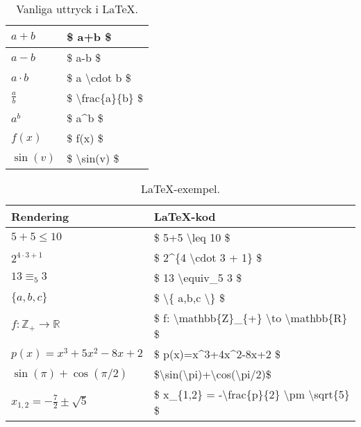\documentclass[titlepage]{article}
\begin{document}
\begin{table}
\begin{minipage}[b]{.5\linewidth}
\begin{center}
\begin{tabular}{| l | l |}
            $a+b$ & \$ a+b \$ \\
            \hline
            $a-b$ & \$ a-b \$ \\
            \hline
            $a \cdot b$ & \$ a \textbackslash cdot b \$ \\
            \hline
            $\frac{a}{b}$ & \$ \textbackslash frac\{a\}\{b\} \$ \\
            \hline
            $a^b$ & \$ a\textasciicircum b \$ \\
            \hline
            $f(x)$ & \$ f(x) \$ \\
            \hline
            $\sin(v)$ & \$ \textbackslash sin(v) \$ \\
            \hline
        \end{tabular}
        \caption{Vanliga uttryck i \LaTeX.}
        \label{t2}
    \end{center}
\end{minipage}
\end{table}

\begin{table}[H]
    \begin{center}
        \begin{tabular}{| l | l |}
            \hline
            \textbf{Rendering} & \textbf{\LaTeX-kod} \\
            \hline
            $5+5 \leq 10$ & \$ 5+5 \textbackslash leq 10 \$ \\
            \hline
            $2^{4\cdot3 + 1}$ & \$ 2\textasciicircum \{4 \textbackslash cdot 3 + 1\} \$ \\
            \hline
            $13 \equiv_5 3$ & \$ 13 \textbackslash equiv\_5 3 \$ \\
            \hline
            $\{a,b,c\}$ & \$ \textbackslash\{ a,b,c \textbackslash\} \$ \\
            \hline
            $f:\mathbb{Z}_{+} \to \mathbb{R}$ & \$ f: \textbackslash mathbb\{Z\}\_\{+\} \textbackslash to \textbackslash mathbb\{R\} \$ \\
            \hline
            $p(x)=x^3+5x^2-8x+2$ & \$ p(x)=x\textasciicircum 3+4x\textasciicircum 2-8x+2 \$ \\
            \hline
            $\sin(\pi)+\cos(\pi/2)$ & \$\textbackslash sin(\textbackslash pi)+\textbackslash cos(\textbackslash pi/2)\$ \\
            \hline
            $x_{1,2} = -\frac{7}{2} \pm \sqrt{5}$ & \$ x\_\{1,2\} = -\textbackslash frac\{p\}\{2\} \textbackslash pm \textbackslash sqrt\{5\} \$ \\
            \hline
        \end{tabular}
        \caption{\LaTeX-exempel.}
        \label{t3}
    \end{center}
\end{table}
\end{document}
